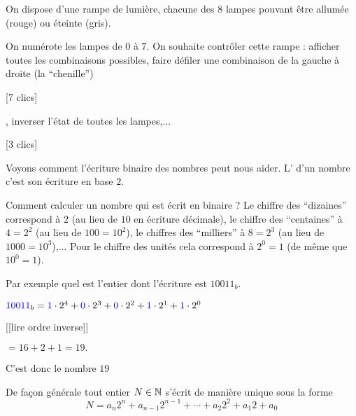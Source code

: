 \diapo

On dispose d'une rampe de lumière, chacune des $8$ lampes pouvant être 
allumée (rouge) ou éteinte (gris).


On numérote les lampes de $0$ à $7$.
On souhaite contrôler cette rampe : afficher toutes les combinaisons possibles, faire défiler 
une combinaison de la gauche à droite (la ``chenille'')

[7 clics]

\change

\change

\change

\change

\change

\change

\change

, inverser l'état de toutes les lampes,...

[3 clics]

\change

\change

\change


Voyons comment l'écriture binaire des nombres peut nous aider.
L' d'un nombre c'est son écriture en base $2$.

\change

Comment calculer un nombre qui est écrit en binaire ?
Le chiffre des ``dizaines'' correspond à $2$ (au lieu de $10$ en écriture décimale),
le chiffre des ``centaines'' à $4=2^2$ (au lieu de $100=10^2$), 
le chiffres des ``milliers'' à $8=2^3$ (au lieu de $1000=10^3$),...
Pour le chiffre des unités cela correspond à $2^0 = 1$ (de même que $10^0=1$).

\change

Par exemple quel est l'entier dont l'écriture est $10011_b$.

\change


${\color{blue}10011}_b = {\color{blue}1} \cdot 2^4 + {\color{blue}0} \cdot 2^3 + 
{\color{blue}0} \cdot 2^2 + {\color{blue}1}\cdot 2^1 + {\color{blue}1}\cdot 2^0$ 

[[lire ordre inverse]]

\change

$= 16+2+1=19.$

\change

C'est donc le nombre $19$

\change

De façon générale tout entier $N\in \mathbb{N}$ s'écrit de manière unique sous la forme
$$N= a_n 2^n+ a_{n-1}2^{n-1}+\cdots + a_2 2^2 + a_1 2 + a_0$$

